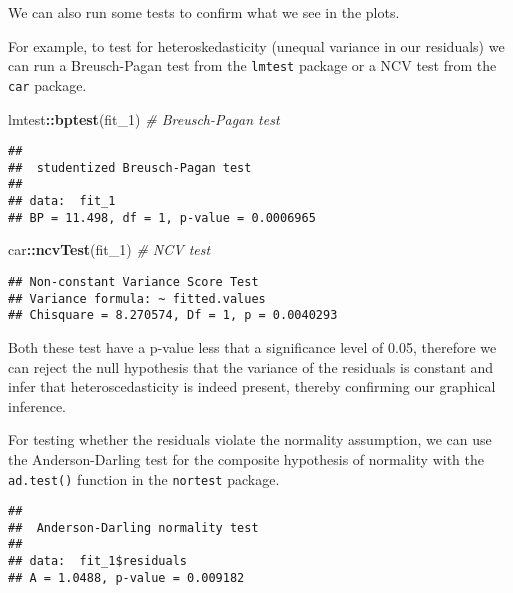\documentclass[
]{book}
\newenvironment{Shaded}{\begin{snugshade}}{\end{snugshade}}
\newcommand{\CommentTok}[1]{\textcolor[rgb]{0.56,0.35,0.01}{\textit{#1}}}
\newcommand{\FunctionTok}[1]{\textcolor[rgb]{0.13,0.29,0.53}{\textbf{#1}}}
\newcommand{\NormalTok}[1]{#1}
\newcommand{\SpecialCharTok}[1]{\textcolor[rgb]{0.81,0.36,0.00}{\textbf{#1}}}
\begin{document}
We can also run some tests to confirm what we see in the plots.

For example, to test for heteroskedasticity (unequal variance in our residuals) we can run a Breusch-Pagan test from the \texttt{lmtest} package or a NCV test from the \texttt{car} package.

\begin{Shaded}
\begin{Highlighting}[]
\NormalTok{lmtest}\SpecialCharTok{::}\FunctionTok{bptest}\NormalTok{(fit\_1)  }\CommentTok{\# Breusch{-}Pagan test}
\end{Highlighting}
\end{Shaded}

\begin{verbatim}
## 
##  studentized Breusch-Pagan test
## 
## data:  fit_1
## BP = 11.498, df = 1, p-value = 0.0006965
\end{verbatim}

\begin{Shaded}
\begin{Highlighting}[]
\NormalTok{car}\SpecialCharTok{::}\FunctionTok{ncvTest}\NormalTok{(fit\_1) }\CommentTok{\# NCV test}
\end{Highlighting}
\end{Shaded}

\begin{verbatim}
## Non-constant Variance Score Test 
## Variance formula: ~ fitted.values 
## Chisquare = 8.270574, Df = 1, p = 0.0040293
\end{verbatim}

Both these test have a p-value less that a significance level of 0.05, therefore we can reject the null hypothesis that the variance of the residuals is constant and infer that heteroscedasticity is indeed present, thereby confirming our graphical inference.

For testing whether the residuals violate the normality assumption, we can use the Anderson-Darling test for the composite hypothesis of normality with the \texttt{ad.test()} function in the \texttt{nortest} package.

\begin{Shaded}
\end{Shaded}

\begin{verbatim}
## 
##  Anderson-Darling normality test
## 
## data:  fit_1$residuals
## A = 1.0488, p-value = 0.009182
\end{verbatim}
\end{document}

